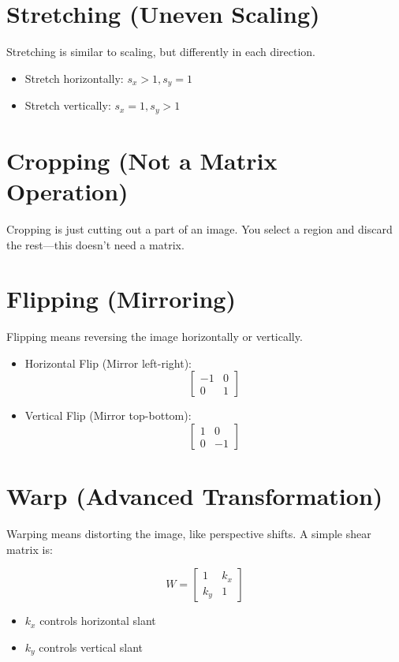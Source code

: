 \documentclass{article}
\begin{document}
\section{Stretching (Uneven Scaling)}
Stretching is similar to scaling, but differently in each direction.

\begin{itemize}
    \item Stretch horizontally: \(s_x > 1, s_y = 1\)
    \item Stretch vertically: \(s_x = 1, s_y > 1\)
\end{itemize}

\section{Cropping (Not a Matrix Operation)}
Cropping is just cutting out a part of an image. You select a region and discard the rest—this doesn’t need a matrix.

\section{Flipping (Mirroring)}
Flipping means reversing the image horizontally or vertically.

\begin{itemize}
    \item Horizontal Flip (Mirror left-right):
    \[
    \begin{bmatrix}
    -1 & 0 \\
    0 & 1
    \end{bmatrix}
    \]
    \item Vertical Flip (Mirror top-bottom):
    \[
    \begin{bmatrix}
    1 & 0 \\
    0 & -1
    \end{bmatrix}
    \]
\end{itemize}

\section{Warp (Advanced Transformation)}
Warping means distorting the image, like perspective shifts. A simple shear matrix is:

\[
W = \begin{bmatrix}
1 & k_x \\
k_y & 1
\end{bmatrix}
\]

\begin{itemize}
    \item \(k_x\) controls horizontal slant
    \item \(k_y\) controls vertical slant
\end{itemize}
\end{document}
